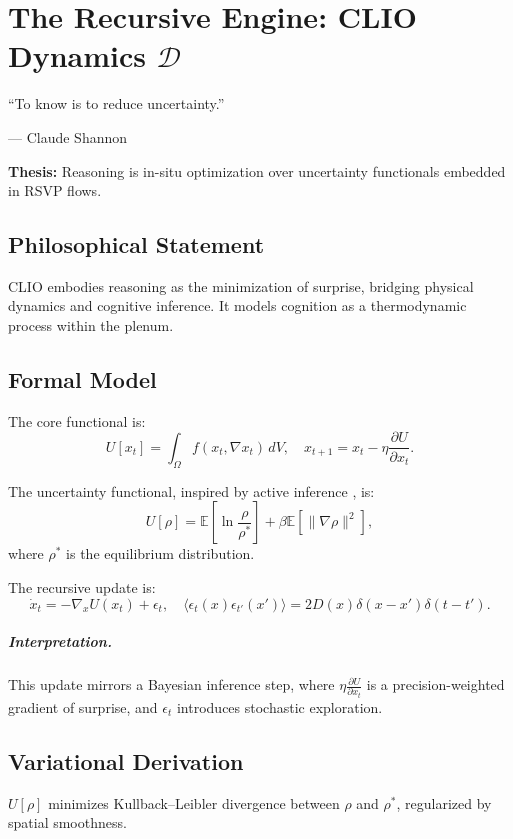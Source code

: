 \documentclass[12pt]{book}
\theoremstyle{definition}
\begin{document}
\chapter{The Recursive Engine: CLIO Dynamics \texorpdfstring{\(\mathcal{D}\)}{D}}
\label{chap:clio}
\epigraph{``To know is to reduce uncertainty.''}{--- Claude Shannon}

\textbf{Thesis:} Reasoning is in-situ optimization over uncertainty functionals embedded in RSVP flows.

\section{Philosophical Statement}
CLIO embodies reasoning as the minimization of surprise, bridging physical dynamics and cognitive inference. It models cognition as a thermodynamic process within the plenum.

\section{Formal Model}
The core functional is:
\begin{equation}
U[x_t] = \int_\Omega f(x_t, \nabla x_t) \, dV, \quad x_{t+1} = x_t - \eta \frac{\partial U}{\partial x_t}.
\end{equation}

The uncertainty functional, inspired by active inference \cite{friston2023active}, is:
\begin{equation}
U[\rho] = \mathbb{E}\left[ \ln \frac{\rho}{\rho^*} \right] + \beta \mathbb{E}\left[ \|\nabla \rho\|^2 \right],
\end{equation}
where \(\rho^*\) is the equilibrium distribution.

The recursive update is:
\begin{equation}
\dot{x}_t = -\nabla_x U(x_t) + \epsilon_t, \quad \langle \epsilon_t(x) \epsilon_{t'}(x') \rangle = 2D(x) \delta(x-x') \delta(t-t').
\end{equation}

\paragraph{Interpretation.} This update mirrors a Bayesian inference step, where \(\eta \frac{\partial U}{\partial x_t}\) is a precision-weighted gradient of surprise, and \(\epsilon_t\) introduces stochastic exploration.

\section{Variational Derivation}
\(U[\rho]\) minimizes Kullback–Leibler divergence between \(\rho\) and \(\rho^*\), regularized by spatial smoothness.
\end{document}

